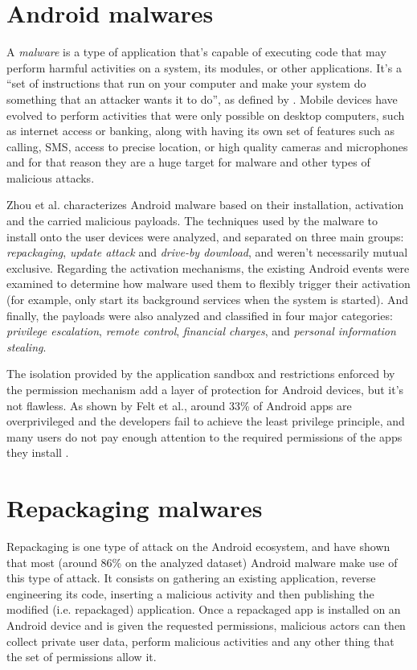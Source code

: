 \section{Android malwares}

A \textit{malware} is a type of application that's capable of executing code that may perform harmful activities on a system, its modules, or other applications. It's a ``set of instructions that run on your computer and make your system do something that an attacker wants it to do'', as defined by \cite{skoudis_malware_2003}. Mobile devices have evolved to perform activities that were only possible on desktop computers, such as internet access or banking, along with having its own set of features such as calling, SMS, access to precise location, or high quality cameras and microphones and for that reason they are a huge target for malware and other types of malicious attacks.

Zhou et al. \cite{zhou_dissecting_2012} characterizes Android malware based on their installation, activation and the carried malicious payloads. The techniques used by the malware to install onto the user devices were analyzed, and separated on three main groups: \textit{repackaging}, \textit{update attack} and \textit{drive-by download}, and weren't necessarily mutual exclusive. Regarding the activation mechanisms, the existing Android events were examined to determine how malware used them to flexibly trigger their activation (for example, only start its background services when the system is started). And finally, the payloads were also analyzed and classified in four major categories: \textit{privilege escalation}, \textit{remote control}, \textit{financial
charges}, and \textit{personal information stealing}.

The isolation provided by the application sandbox and restrictions enforced by the permission mechanism add a layer of protection for Android devices, but it's not flawless. As shown by Felt et al., around 33\% of Android apps are overprivileged and the developers fail to achieve the least privilege principle\cite{felt_android_2011}, and many users do not pay enough attention to the required permissions of the apps they install \cite{felt_android_2012}.

\section{Repackaging malwares}

Repackaging is one type of attack on the Android ecosystem, and \cite{zhou_dissecting_2012} have shown that most (around 86\% on the analyzed dataset) Android malware make use of this type of attack. It consists on gathering an existing application, reverse engineering its code, inserting a malicious activity and then publishing the modified (i.e. repackaged) application. Once a repackaged app is installed on an Android device and is given the requested permissions, malicious actors can then collect private user data, perform malicious activities and any other thing that the set of permissions allow it. 

